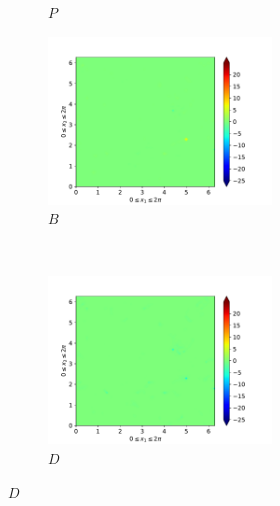 \begin{figure}[H]
\begin{subfigure}{0.45\textwidth}
        \caption{$P$}
    \end{subfigure}
    \newline
    \begin{subfigure}{0.45\textwidth}
        \includegraphics[height=1.75in]{media/run-cds-65/B-ke-1400}
        \caption{$B$}
    \end{subfigure}
    ~
    \begin{subfigure}{0.45\textwidth}
        \includegraphics[height=1.75in]{media/run-cds-65/D-ke-1400}
        \caption{$D$}
    \end{subfigure}
\end{figure}

\newpage

